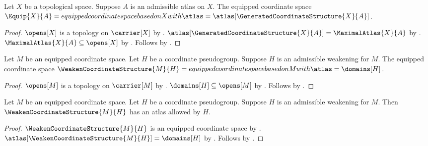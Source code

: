 \begin{construction}\label{equip}
    Let $X$ be a topological space.
    Suppose $A$ is an admissible atlas on $X$.
    The equipped coordinate space $\Equip{X}{A}=
        equipped coordinate space based on X with
        \atlas=\atlas[\GeneratedCoordinateStructure{X}{A}]$.
\end{construction}
\begin{proof}
    $\opens[X]$ is a topology on $\carrier[X]$
        by .
    $\atlas[\GeneratedCoordinateStructure{X}{A}]=\MaximalAtlas{X}{A}$
        by .
    $\MaximalAtlas{X}{A}\subseteq\opens[X]$
        by .
    Follows by .
\end{proof}

\begin{construction}\label{weaken_coordinate_structure}
    Let $M$ be an equipped coordinate space.
    Let $H$ be a coordinate pseudogroup.
    Suppose $H$ is an admissible weakening for $M$.
    The equipped coordinate space $\WeakenCoordinateStructure{M}{H}=
        equipped coordinate space based on M with \atlas=\domains[H]$.
\end{construction}
\begin{proof}
    $\opens[M]$ is a topology on $\carrier[M]$
        by .
    $\domains[H]\subseteq\opens[M]$ by .
    Follows by .
\end{proof}

\begin{theorem}\label{weaken_coordinate_structure_allowed}
    Let $M$ be an equipped coordinate space.
    Let $H$ be a coordinate pseudogroup.
    Suppose $H$ is an admissible weakening for $M$.
    Then $\WeakenCoordinateStructure{M}{H}$ has an atlas allowed by $H$.
\end{theorem}
\begin{proof}
    $\WeakenCoordinateStructure{M}{H}$ is an equipped coordinate space
        by .
    $\atlas[\WeakenCoordinateStructure{M}{H}]=\domains[H]$
        by .
    Follows by .
\end{proof}

